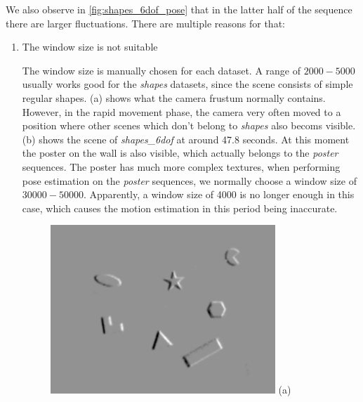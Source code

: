We also observe in \cref{fig:shapes_6dof_pose} that in the latter half
of the sequence there are larger fluctuations. There are multiple
reasons for that:
\begin{enumerate}
\item The window size is not suitable

  The window size is manually chosen for each dataset. A range of
  $2000 - 5000$ usually works good for the \textit{shapes} datasets,
  since the scene consists of simple regular
  shapes. (a) shows what the camera frustum
  normally contains. However, in the rapid movement phase, the camera
  very often moved to a position where other scenes which don't belong
  to \textit{shapes} also becoms visible. (b)
  shows the scene of \textit{shapes\_6dof} at around 47.8 seconds. At
  this moment the poster on the wall is also visible, which actually
  belongs to the \textit{poster} sequences. The poster has much more
  complex textures, when performing pose estimation on the
  \textit{poster} sequences, we normally choose a window size of
  $30000-50000$. Apparently, a window size of 4000 is no longer enough
  in this case, which causes the motion estimation in this period
  being inaccurate.
  \begin{figure}[h]
    \begin{minipage}[t]{0.48\textwidth}
      \centering \includegraphics[width =
      \textwidth]{images/window_size_good.jpg} (a)
    \end{minipage}
    \hfill
    \begin{minipage}[t]{0.48\textwidth}

\end{minipage}
\end{figure}
\end{enumerate}
